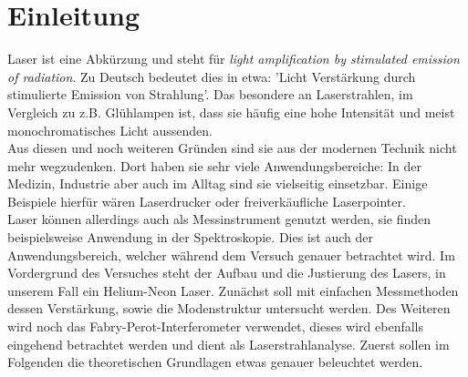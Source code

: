 \chapter{Einleitung}
Laser ist eine Abkürzung und steht für \textit{light amplification by stimulated emission of radiation}.
Zu Deutsch bedeutet dies in etwa: 'Licht Verstärkung durch stimulierte Emission von Strahlung'.
Das besondere an Laserstrahlen, im Vergleich zu z.B. Glühlampen ist, dass sie häufig eine hohe Intensität und 
meist monochromatisches Licht aussenden.\\
Aus diesen und noch weiteren Gründen sind sie aus der modernen Technik nicht mehr wegzudenken.
Dort haben sie sehr viele Anwendungsbereiche: In der Medizin, Industrie aber auch im Alltag sind sie 
vielseitig einsetzbar. Einige Beispiele hierfür wären Laserdrucker oder freiverkäufliche Laserpointer.\\
Laser können allerdings auch als Messinstrument genutzt werden, sie finden beispielsweise Anwendung 
in der Spektroskopie. Dies ist auch der Anwendungsbereich, welcher während dem Versuch genauer betrachtet wird. 
Im Vordergrund des Versuches steht der Aufbau und die Justierung des Lasers, in unserem Fall ein Helium-Neon Laser. 
Zunächst soll mit einfachen Messmethoden dessen Verstärkung, sowie die Modenstruktur untersucht werden. 
Des Weiteren wird noch das Fabry-Perot-Interferometer verwendet, dieses wird ebenfalls eingehend betrachtet werden
und dient als Laserstrahlanalyse. Zuerst sollen im Folgenden die theoretischen Grundlagen etwas genauer beleuchtet werden.

